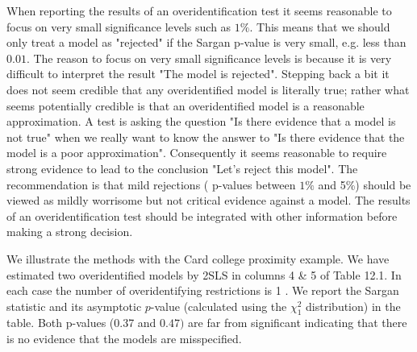 \documentclass[10pt]{article}
\begin{document}
When reporting the results of an overidentification test it seems reasonable to focus on very small significance levels such as $1 \%$. This means that we should only treat a model as "rejected" if the Sargan p-value is very small, e.g. less than $0.01$. The reason to focus on very small significance levels is because it is very difficult to interpret the result "The model is rejected". Stepping back a bit it does not seem credible that any overidentified model is literally true; rather what seems potentially credible is that an overidentified model is a reasonable approximation. A test is asking the question "Is there evidence that a model is not true" when we really want to know the answer to "Is there evidence that the model is a poor approximation". Consequently it seems reasonable to require strong evidence to lead to the conclusion "Let's reject this model". The recommendation is that mild rejections ( $\mathrm{p}$-values between $1 \%$ and 5\%) should be viewed as mildly worrisome but not critical evidence against a model. The results of an overidentification test should be integrated with other information before making a strong decision.

We illustrate the methods with the Card college proximity example. We have estimated two overidentified models by 2SLS in columns 4 \& 5 of Table 12.1. In each case the number of overidentifying restrictions is 1 . We report the Sargan statistic and its asymptotic $p$-value (calculated using the $\chi_{1}^{2}$ distribution) in the table. Both p-values (0.37 and $0.47)$ are far from significant indicating that there is no evidence that the models are misspecified.
\end{document}

